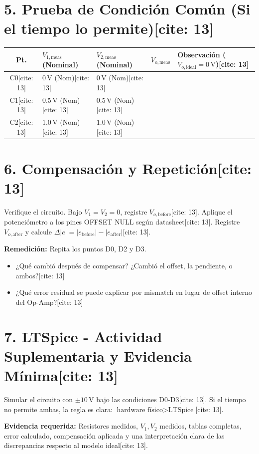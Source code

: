 \documentclass[11pt, a4paper]{article}
\begin{document}
\section*{5. Prueba de Condición Común (Si el tiempo lo permite)[cite: 13]}
\begin{table}[h]
    \centering
    \footnotesize
    \renewcommand{\arraystretch}{1.5}
    \begin{tabularx}{\textwidth}{|c|>{\centering\arraybackslash}X|>{\centering\arraybackslash}X|>{\centering\arraybackslash}X|>{\centering\arraybackslash}X|}
    \hline
    \textbf{Pt.} & \textbf{$V_{1,\mathrm{meas}}$ (Nominal)} & \textbf{$V_{2,\mathrm{meas}}$ (Nominal)} & \textbf{$V_{o,\mathrm{meas}}$} & \textbf{Observación ($V_{o,\mathrm{ideal}} = 0\,\text{V}$)[cite: 13]} \\ \hline
    C0[cite: 13] & $0\,\text{V}$ (Nom)[cite: 13] & $0\,\text{V}$ (Nom)[cite: 13] & & \\ \hline
    C1[cite: 13] & $0.5\,\text{V}$ (Nom)[cite: 13] & $0.5\,\text{V}$ (Nom)[cite: 13] & & \\ \hline
    C2[cite: 13] & $1.0\,\text{V}$ (Nom)[cite: 13] & $1.0\,\text{V}$ (Nom)[cite: 13] & & \\ \hline
    \end{tabularx}
\end{table}

\section*{6. Compensación y Repetición[cite: 13]}
Verifique el circuito. Bajo $V_1=V_2=0$, registre $V_{o,\mathrm{before}}$[cite: 13]. Aplique el potenciómetro a los pines OFFSET NULL según datasheet[cite: 13]. Registre $V_{o,\mathrm{after}}$ y calcule $\Delta|e|=|e_{\mathrm{before}}|-|e_{\mathrm{after}}|$[cite: 13].

\textbf{Remedición:} Repita los puntos D0, D2 y D3.
\begin{itemize}
    \setlength{\itemsep}{0pt}
    \item ¿Qué cambió después de compensar? ¿Cambió el offset, la pendiente, o ambos?[cite: 13]
    \item ¿Qué error residual se puede explicar por mismatch en lugar de offset interno del Op-Amp?[cite: 13]
\end{itemize}

\section*{7. LTSpice - Actividad Suplementaria y Evidencia Mínima[cite: 13]}
Simular el circuito con $\pm10\,\text{V}$ bajo las condiciones D0-D3[cite: 13]. Si el tiempo no permite ambas, la regla es clara: $\boxed{\text{hardware físico} > \text{LTSpice}}$[cite: 13].

\textbf{Evidencia requerida:} Resistores medidos, $V_1, V_2$ medidos, tablas completas, error calculado, compensación aplicada y una interpretación clara de las discrepancias respecto al modelo ideal[cite: 13].
\end{document}
